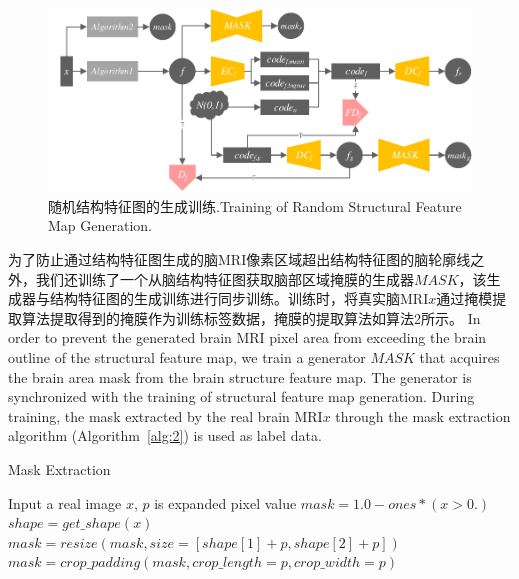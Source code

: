 \documentclass[letterpaper]{article} %
\begin{document}
\begin{figure}
	\centering
	\includegraphics[width=0.98\columnwidth]{figures/feature_train}
	\caption{随机结构特征图的生成训练.Training of Random Structural Feature Map Generation.}
	\label{feature_train}
\end{figure}

为了防止通过结构特征图生成的脑MRI像素区域超出结构特征图的脑轮廓线之外，我们还训练了一个从脑结构特征图获取脑部区域掩膜的生成器$MASK$，该生成器与结构特征图的生成训练进行同步训练。训练时，将真实脑MRI$x$通过掩模提取算法提取得到的掩膜作为训练标签数据，掩膜的提取算法如算法2所示。
In order to prevent the generated brain MRI pixel area from exceeding the brain outline of the structural feature map, we train a generator $MASK$ that acquires the brain area mask from the brain structure feature map. The generator is synchronized with the  training of structural feature map generation. During training, the mask extracted by the real brain MRI$x$ through the mask extraction algorithm (Algorithm~\ref{alg:2}) is used as label data.
\begin{algorithm}
	\caption{Mask Extraction}
	\label{alg:2}
	\begin{algorithmic}[1]
		\State Input a real image $x$, $p$ is expanded pixel value
		\State $mask = 1.0 - ones * (x > 0.)$
		\State $shape = get\_shape(x)$
		\State $mask = resize(mask, size=[shape[1] + p, shape[2] + p])$
		\State $mask = crop\_padding(mask, crop\_length=p, crop\_width=p)$
	\end{algorithmic}  
\end{algorithm}
\end{document}
